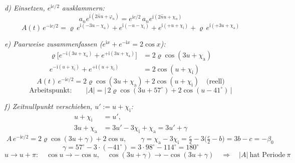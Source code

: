 \noindent\textit{d) Einsetzen, $e^{\mathrm{i}c/2}$ ausklammern:}
\begin{equation}
  a_n e^{\mathrm{i}(2\hat n u+\varphi_n)} = e^{\mathrm{i}c/2}\,a_n e^{\mathrm{i}(2\hat n u+\chi_n)}
\end{equation}
\begin{equation}
  A(t)\,e^{-\mathrm{i}c/2}
  = \varrho\,e^{\mathrm{i}(-3u-\chi_\mathrm{a})}
  + e^{\mathrm{i}(-u-\chi_\mathrm{i})}
  + e^{\mathrm{i}(+u+\chi_\mathrm{i})}
  + \varrho\,e^{\mathrm{i}(+3u+\chi_\mathrm{a})}
\end{equation}

\noindent\textit{e) Paarweise zusammenfassen ($e^{\mathrm{i}x}+e^{-\mathrm{i}x}=2\cos x$):}
\begin{align}
  \varrho\bigl[e^{-\mathrm{i}(3u+\chi_\mathrm{a})}+e^{+\mathrm{i}(3u+\chi_\mathrm{a})}\bigr]
  &= 2\varrho\cos(3u+\chi_\mathrm{a})\\
  e^{-\mathrm{i}(u+\chi_\mathrm{i})}+e^{+\mathrm{i}(u+\chi_\mathrm{i})}
  &= 2\cos(u+\chi_\mathrm{i})
\end{align}
\begin{equation}
  A(t)\,e^{-\mathrm{i}c/2} = 2\varrho\cos(3u+\chi_\mathrm{a}) + 2\cos(u+\chi_\mathrm{i})
  \quad\text{(reell)}
\end{equation}
\begin{equation}
  \text{Arbeitspunkt:}\qquad |A| = \bigl|\,2\varrho\cos(3u+57^\circ)+2\cos(u-41^\circ)\,\bigr|
\end{equation}

\noindent\textit{f) Zeitnullpunkt verschieben, $u' := u+\chi_\mathrm{i}$:}
\begin{align}
  u+\chi_\mathrm{i} &= u',\\
  3u+\chi_\mathrm{a} &= 3u'-3\chi_\mathrm{i}+\chi_\mathrm{a} = 3u'+\gamma
\end{align}
\begin{equation}
  \boxed{\;
  A\,e^{-\mathrm{i}c/2} = 2\varrho\cos(3u+\gamma)+2\cos u,\qquad
  \gamma = \chi_\mathrm{a}-3\chi_\mathrm{i}
         = \tfrac{c}{2}-3\bigl(\tfrac{c}{2}-b\bigr) = 3b-c = -\beta_0
  \;}
  \label{eq:cf-n4env}
\end{equation}
\begin{equation}
  \gamma = 57^\circ-3\cdot(-41^\circ) = 3\cdot98^\circ-114^\circ = 180^\circ
\end{equation}
\begin{equation}
  u\to u+\pi:\quad \cos u\to-\cos u,\quad \cos(3u+\gamma)\to-\cos(3u+\gamma)
  \quad\Longrightarrow\quad |A|\ \text{hat Periode}\ \pi
\end{equation}

